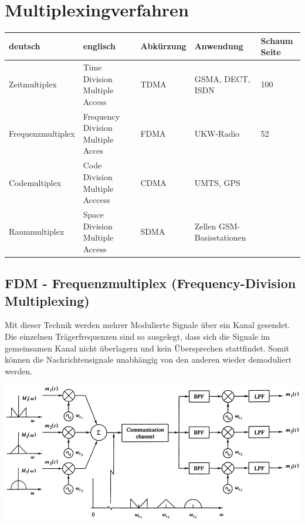 \section{Multiplexingverfahren} \label{multiplex}
\begin{tabular}{|l|l|l|l|l|}
\hline
\textbf{deutsch} & \textbf{englisch} &
\textbf{Abkürzung} & \textbf{Anwendung} &
\textbf{Schaum Seite} \\
\hline
Zeitmultiplex & Time Division Multiple Access & TDMA & GSMA, DECT, ISDN & 100 \\
\hline
Frequenzmultiplex & Frequency Division Multiple Acces & FDMA & UKW-Radio & 52 \\
\hline
Codemultiplex & Code Division Multiple Acccess & CDMA & UMTS, GPS & \\
\hline
Raummultiplex & Space Division Multiple Access & SDMA & Zellen
GSM-Basisstationen & \\
\hline
\end{tabular}

\subsection{FDM - Frequenzmultiplex (Frequency-Division Multiplexing)}
Mit dieser Technik werden mehrer Modulierte Signale über ein Kanal gesendet. Die einzelnen
Trägerfrequenzen sind so ausgelegt, dass sich die Signale im gemeinsamen Kanal nicht überlagern und
kein Übersprechen stattfindet. Somit können die Nachrichtensignale unabhängig von den anderen
wieder demoduliert werden.
\begin{center}
    \includegraphics[width=14cm]{bilder/multiplex_fdm_blockdiagramm.png}
\end{center}

